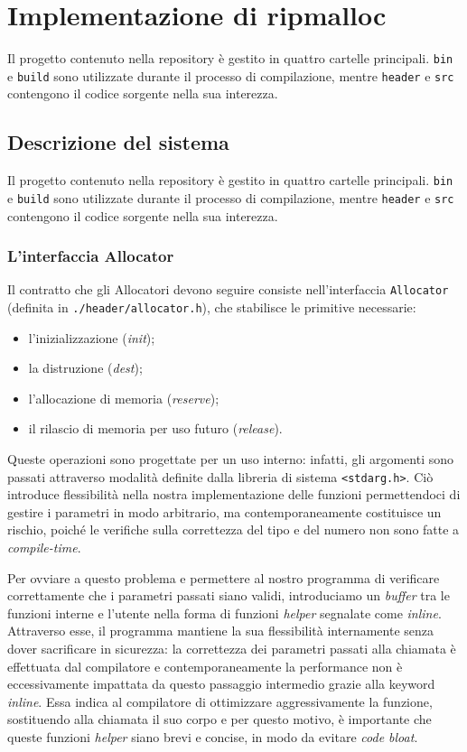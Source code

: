 \chapter{Implementazione di ripmalloc}

Il progetto contenuto nella repository è gestito in quattro cartelle principali. \texttt{bin} e \texttt{build} sono utilizzate durante il processo di compilazione, mentre \texttt{header} e \texttt{src} contengono il codice sorgente nella sua interezza.

\section{Descrizione del sistema}

Il progetto contenuto nella repository è gestito in quattro cartelle principali. \texttt{bin} e \texttt{build} sono utilizzate durante il processo di compilazione, mentre \texttt{header} e \texttt{src} contengono il codice sorgente nella sua interezza.

\subsection{L’interfaccia Allocator}

Il contratto che gli Allocatori devono seguire consiste nell’interfaccia \texttt{Allocator} (definita in \texttt{./header/allocator.h}), che stabilisce le primitive necessarie:
\begin{itemize}
  \item l’inizializzazione (\textit{init});
  \item la distruzione (\textit{dest});
  \item l’allocazione di memoria (\textit{reserve});
  \item il rilascio di memoria per uso futuro (\textit{release}).
\end{itemize}
Queste operazioni sono progettate per un uso interno: infatti, gli argomenti sono passati attraverso modalità definite dalla libreria di sistema \texttt{<stdarg.h>}. Ciò introduce flessibilità nella nostra implementazione delle funzioni permettendoci di gestire i parametri in modo arbitrario, ma contemporaneamente costituisce un rischio, poiché le verifiche sulla correttezza del tipo e del numero non sono fatte a \textit{compile-time}.

Per ovviare a questo problema e permettere al nostro programma di verificare correttamente che i parametri passati siano validi, introduciamo un \textit{buffer} tra le funzioni interne e l’utente nella forma di funzioni \textit{helper} segnalate come \textit{inline}. Attraverso esse, il programma mantiene la sua flessibilità internamente senza dover sacrificare in sicurezza: la correttezza dei parametri passati alla chiamata è effettuata dal compilatore e contemporaneamente la performance non è eccessivamente impattata da questo passaggio intermedio grazie alla keyword \textit{inline}. Essa indica al compilatore di ottimizzare aggressivamente la funzione, sostituendo alla chiamata il suo corpo e per questo motivo, è importante che queste funzioni \textit{helper} siano brevi e concise, in modo da evitare \textit{code bloat}.

